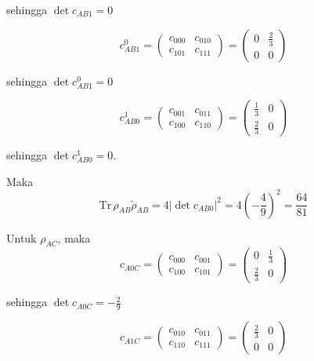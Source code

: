 sehingga $\det c_{AB1} = 0$

\begin{equation}
	c_{AB1}^0=
	\begin{pmatrix}
		c_{000} & c_{010} \\
		c_{101} & c_{111}
	\end{pmatrix}=
	\begin{pmatrix}
		0 & \frac{2}{3} \\
		0 & 0
	\end{pmatrix}
\end{equation}

sehingga $\det c_{AB1}^0 = 0$

\begin{equation}
	c_{AB0}^1=
	\begin{pmatrix}
		c_{001} & c_{011} \\
		c_{100} & c_{110}
	\end{pmatrix}=
	\begin{pmatrix}
		\frac{1}{3} & 0 \\
		\frac{2}{3} & 0
	\end{pmatrix}
\end{equation}

sehingga $\det c_{AB0}^1 = 0$.

Maka
\begin{equation}
	\mathrm{Tr}\,\rho_{AB}\tilde{\rho}_{AB}=4|\det c_{AB0}|^2=4(-\frac{4}{9})^2=\frac{64}{81}
\end{equation}

Untuk $\rho_{AC}$, maka
\begin{equation}
	c_{A0C}=
	\begin{pmatrix}
		c_{000} & c_{001} \\
		c_{100} & c_{101}
	\end{pmatrix}=
	\begin{pmatrix}
		0 & \frac{1}{3} \\
		\frac{2}{3} & 0
	\end{pmatrix}
\end{equation}

sehingga $\det c_{A0C} = -\frac{2}{9}$

\begin{equation}
	c_{A1C}=
	\begin{pmatrix}
		c_{010} & c_{011} \\
		c_{110} & c_{111}
	\end{pmatrix}=
	\begin{pmatrix}
		\frac{2}{3} & 0 \\
		0 & 0
	\end{pmatrix}
\end{equation}

